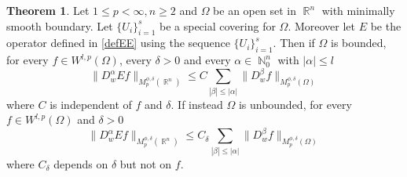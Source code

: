 \documentclass[12pt]{article}
\theoremstyle{definition}
\newtheorem{theorem}{Theorem}
\DeclareMathOperator\rr{\mathbb{R}}
\DeclareMathOperator\nn{\mathbb{N}}
\begin{document}
\begin{theorem}

Let $1\le p<\infty,n\ge2$ and $\Omega$ be an open set in $\rr^n$ with minimally smooth boundary. Let $\{ U_i\}_{i=1}^s$ be a special covering for $\Omega.$ Moreover let $E$ be the operator defined in \eqref{defEE} using the sequence $\{ U_i\}_{i=1}^s$. Then if $\Omega$ is bounded, for every $f \in W^{l,p}(\Omega)$, every $\delta>0$ and every $\alpha \in \nn_0^n$ with $|\alpha|\le l$ 
\begin{equation}
 \| D^\alpha_w Ef\|_{M_p^{\phi,\delta}(\rr^n)}\le C\sum_{|\beta|\le |\alpha|}\|D^\beta_w f \|_{M_p^{\phi,\delta}(\Omega)} \label{Ebound1}
 \end{equation}
 where $C$ is independent of $f$ and $\delta.$ If instead $\Omega$ is unbounded, for every $f \in W^{l,p}(\Omega)$ and $\delta>0$
\begin{equation}
 \| D^\alpha_w Ef\|_{M_p^{\phi,\delta}(\rr^n)}\le C_\delta\sum_{|\beta|\le |\alpha|}\|D^\beta_w f \|_{M_p^{\phi,\delta}(\Omega)} \label{Ebound2}
 \end{equation}
 where $C_\delta$ depends on $\delta$ but not on $f.$
\end{theorem}
\end{document}
